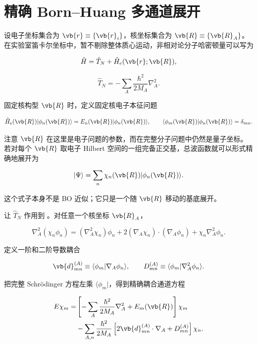 \section{精确 Born--Huang 多通道展开}

设电子坐标集合为 \(\vb{r}\equiv\{\vb{r}_i\}\)，核坐标集合为 \(\vb{R}\equiv\{\vb{R}_A\}\)。在实验室笛卡尔坐标中，暂不剔除整体质心运动，非相对论分子哈密顿量可以写为

\[
\hat H
=\hat T_N+\hat H_e(\vb{r};\vb{R}),
\]

\[
\hat T_N
=-\sum_A\frac{\hbar^2}{2M_A}\nabla_A^2.
\]

固定核构型 \(\vb{R}\) 时，定义固定核电子本征问题

\begin{equation}
\hat H_e(\vb{R})|\phi_n(\vb{R})\rangle
=E_n(\vb{R})|\phi_n(\vb{R})\rangle,
\qquad
\langle\phi_m(\vb{R})|\phi_n(\vb{R})\rangle=\delta_{mn}.
\label{eq:clamped-electronic-problem}
\end{equation}

注意 \(\vb{R}\) 在这里是电子问题的参数，而在完整分子问题中仍然是量子坐标。若对每个 \(\vb{R}\) 取电子 Hilbert 空间的一组完备正交基，总波函数就可以形式精确地展开为

\begin{equation}
|\Psi\rangle
=\sum_n\chi_n(\vb{R})|\phi_n(\vb{R})\rangle.
\label{eq:born-huang-expansion}
\end{equation}

这个式子本身不是 BO 近似；它只是一个随 \(\vb{R}\) 移动的基底展开。

让 \(\hat T_N\) 作用到 。对任意一个核坐标 \(\vb{R}_A\)，

\[
\nabla_A^2(\chi_n\phi_n)
=(\nabla_A^2\chi_n)\phi_n
+2(\nabla_A\chi_n)\cdot(\nabla_A\phi_n)
+\chi_n\nabla_A^2\phi_n.
\]

定义一阶和二阶导数耦合

\begin{equation}
\vb{d}_{mn}^{(A)}
\equiv\langle\phi_m|\nabla_A\phi_n\rangle,
\qquad
D_{mn}^{(A)}
\equiv\langle\phi_m|\nabla_A^2\phi_n\rangle.
\label{eq:derivative-couplings}
\end{equation}

把完整 Schr\"odinger 方程左乘 \(\langle\phi_m|\)，得到精确耦合通道方程

\begin{equation}
\begin{aligned}
E\chi_m
=&\left[-\sum_A\frac{\hbar^2}{2M_A}\nabla_A^2+E_m(\vb{R})\right]\chi_m
\\
&-\sum_{A,n}\frac{\hbar^2}{2M_A}
\left[
2\vb{d}_{mn}^{(A)}\cdot\nabla_A
+D_{mn}^{(A)}
\right]\chi_n.
\end{aligned}
\label{eq:born-huang-coupled}
\end{equation}

